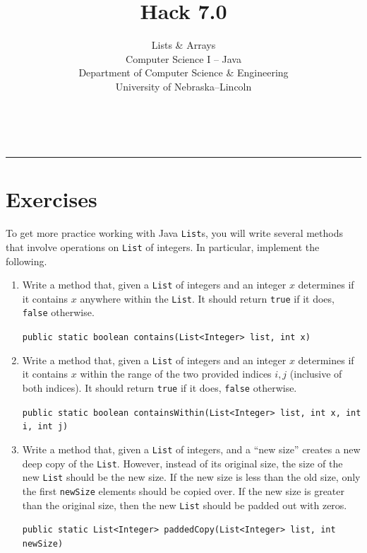 \documentclass[12pt]{scrartcl}
\title{Hack 7.0}\let\Title\@title
\subtitle{Lists \& Arrays \\
Computer Science I -- Java\\
{\small
\vskip1cm
Department of Computer Science \& Engineering \\
University of Nebraska--Lincoln}
\vskip-1cm}
\date{~}
\begin{document}
\maketitle

\hrule



\section*{Exercises}

To get more practice working with Java \texttt{List}s, you 
will write several methods that involve operations on \texttt{List}
of integers. In particular, implement the following.

\begin{enumerate}

  \item Write a method that, given a \texttt{List} of integers
  and an integer $x$ determines if it contains $x$ anywhere within the 
  \texttt{List}.  It should return \texttt{true} if it 
  does, \texttt{false} otherwise.
  
  \texttt{public static boolean contains(List<Integer> list, int x)}

  \item Write a method that, given a \texttt{List} of integers
  and an integer $x$ determines if it contains $x$ within the range of 
  the two provided indices $i, j $ (inclusive of both indices).
  It should return \texttt{true} if it 
  does, \texttt{false} otherwise.

  
  \texttt{public static boolean containsWithin(List<Integer> list, int x, int i, int j)}
  
  \item Write a method that, given a \texttt{List} of integers, 
  and a ``new size'' creates a new deep copy of the \texttt{List}.  
  However, instead of its original size, the size of the new 
  \texttt{List} should be the new size.  If the new
  size is less than the old size, only the first \texttt{newSize} 
  elements should be copied over.  If the new size is greater than the original
  size, then the new \texttt{List} should be padded out with zeros.
  
  \texttt{public static List<Integer> paddedCopy(List<Integer> list, int newSize)}


\end{enumerate}
\end{document}
